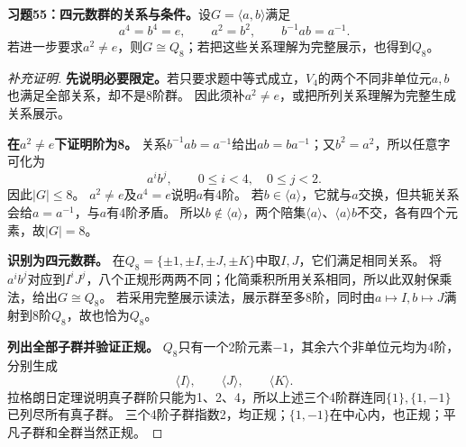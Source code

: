 \begin{problem}
\textbf{习题55：四元数群的关系与条件。}设$G=\langle a,b\rangle$满足
\[
a^4=b^4=e,\qquad a^2=b^2,\qquad b^{-1}ab=a^{-1}.
\]
若进一步要求$a^2\neq e$，则$G\cong Q_8$；若把这些关系理解为完整展示，也得到$Q_8$。
\end{problem}
\begin{proof}[补充证明]
\textbf{先说明必要限定。}若只要求题中等式成立，$V_4$的两个不同非单位元$a,b$也满足全部关系，却不是8阶群。
因此须补$a^2\neq e$，或把所列关系理解为完整生成关系展示。

\textbf{在$a^2\neq e$下证明阶为8。}
关系$b^{-1}ab=a^{-1}$给出$ab=ba^{-1}$；又$b^2=a^2$，所以任意字可化为
\[
a^ib^j,\qquad0\leq i<4,\quad0\leq j<2.
\]
因此$|G|\leq8$。
$a^2\neq e$及$a^4=e$说明$a$有4阶。
若$b\in\langle a\rangle$，它就与$a$交换，但共轭关系会给$a=a^{-1}$，与$a$有4阶矛盾。
所以$b\notin\langle a\rangle$，两个陪集$\langle a\rangle$、$\langle a\rangle b$不交，各有四个元素，故$|G|=8$。

\textbf{识别为四元数群。}
在$Q_8=\{\pm1,\pm I,\pm J,\pm K\}$中取$I,J$，它们满足相同关系。
将$a^ib^j$对应到$I^iJ^j$，八个正规形两两不同；化简乘积所用关系相同，所以此双射保乘法，给出$G\cong Q_8$。
若采用完整展示读法，展示群至多8阶，同时由$a\mapsto I,b\mapsto J$满射到8阶$Q_8$，故也恰为$Q_8$。

\textbf{列出全部子群并验证正规。}
$Q_8$只有一个2阶元素$-1$，其余六个非单位元均为4阶，分别生成
\[
\langle I\rangle,\qquad\langle J\rangle,\qquad\langle K\rangle.
\]
拉格朗日定理说明真子群阶只能为1、2、4，所以上述三个4阶群连同$\{1\},\{1,-1\}$已列尽所有真子群。
三个4阶子群指数2，均正规；$\{1,-1\}$在中心内，也正规；平凡子群和全群当然正规。
\end{proof}

